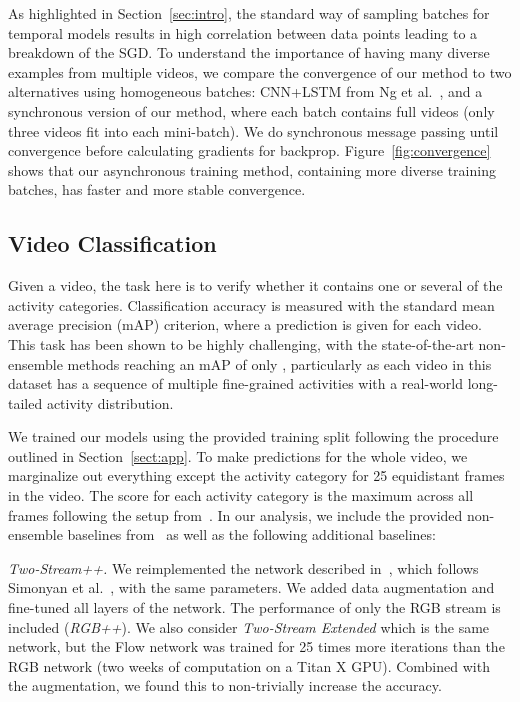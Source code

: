 \documentclass[10pt,twocolumn,letterpaper]{article}
\newcommand{\myparagraph}[1]{\vspace{.3em}\noindent{\bf #1}}
\begin{document}
\myparagraph{Diverse batches}
As highlighted in Section~\ref{sec:intro}, the standard way of sampling batches for temporal models results in high correlation between data points leading to a breakdown of the SGD. To understand the importance of having many diverse examples from multiple videos, we compare the convergence of our method to two alternatives using homogeneous batches: CNN+LSTM from Ng et al.~\cite{cnnlstm}, and a synchronous version of our method, where each batch contains full videos (only three videos fit into each mini-batch). We do synchronous message passing until convergence before calculating gradients for backprop. Figure~\ref{fig:convergence} shows that our asynchronous training method, containing more diverse training batches, has faster and more stable convergence. 

\subsection{Video Classification}


Given a video, the task here is to verify whether it contains one or several of the  activity categories. Classification accuracy is measured with the standard mean average precision (mAP) criterion, where a prediction is given for each video. This task has been shown to be highly challenging, with the state-of-the-art non-ensemble methods reaching an mAP of only , particularly as each video in this dataset has a sequence of multiple fine-grained activities with a real-world long-tailed activity distribution. 

We trained our models using the provided training split following the procedure outlined in Section~\ref{sect:app}. To make predictions for the whole video, we marginalize out everything except the activity category for 25 equidistant frames in the video. The score for each activity category is the maximum across all frames following the setup from~\cite{charades}. In our analysis, we include the provided non-ensemble baselines from~\cite{charades} as well as the following additional baselines:

{\em Two-Stream++.} We reimplemented the network described in~\cite{charades}, which follows Simonyan et al.~\cite{Simonyan15}, with the same parameters. We added data augmentation and fine-tuned all layers of the network. The performance of only the RGB stream is included ({\em RGB++}). We also consider {\em Two-Stream Extended} which is the same network, but the Flow network was trained for 25 times more iterations than the RGB network (two weeks of computation on a Titan X GPU). Combined with the augmentation, we found this to non-trivially increase the accuracy.
\end{document}
